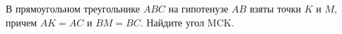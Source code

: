\begin{ex}
	\begin{condition}
		В прямоугольном треугольнике \( ABC  \) на гипотенузе \( AB  \) взяты точки \( K  \) и \( M  \), причем \( AK = AC  \) и \( BM = BC \).
		Найдите угол MCK.
	\end{condition}
	\answer{\( 45\degree \)}
\end{ex}